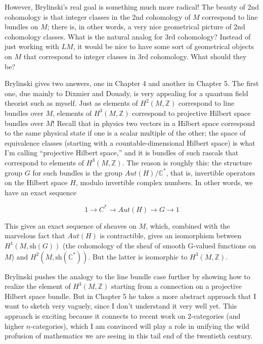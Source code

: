 \documentclass{article}
\begin{document}
However, Brylinski's real goal is something much more radical! The
beauty of 2nd cohomology is that integer classes in the 2nd cohomology
of \(M\) correspond to line bundles on \(M\); there is, in other words,
a very nice geometrical picture of 2nd cohomology classes. What is the
natural analog for 3rd cohomology? Instead of just working with \(LM\),
it would be nice to have some sort of geometrical objects on \(M\) that
correspond to integer classes in 3rd cohomology. What should they be?

Brylinski gives two answers, one in Chapter 4 and another in Chapter 5.
The first one, due mainly to Dixmier and Douady, is very appealing for a
quantum field theorist such as myself. Just as elements of
\(H^2(M,\mathbb{Z})\) correspond to line bundles over \(M\), elements of
\(H^3(M,\mathbb{Z})\) correspond to projective Hilbert space bundles
over \(M\)! Recall that in physics two vectors in a Hilbert space
correspond to the same physical state if one is a scalar multiple of the
other; the space of equivalence classes (starting with a
countable-dimensional Hilbert space) is what I'm calling ``projective
Hilbert space,'' and it is bundles of such rascals that correspond to
elements of \(H^3(M,\mathbb{Z})\). The reason is roughly this: the
structure group \(G\) for such bundles is the group
\(Aut(H)/\mathbb{C}^*\), that is, invertible operators on the Hilbert
space \(H\), modulo invertible complex numbers. In other words, we have
an exact sequence

\[1 \to C^* \to Aut(H) \to G \to 1\]

This gives an exact sequence of sheaves on \(M\), which, combined with
the marvelous fact that \(Aut(H)\) is contractible, gives an isomorphism
between \(H^1(M,\mathrm{sh}(G))\) (the cohomology of the sheaf of smooth
G-valued functions on \(M\)) and \(H^2(M,\mathrm{sh}(\mathbb{C}^*))\).
But the latter is isomorphic to \(H^3(M,\mathbb{Z})\).

Brylinski pushes the analogy to the line bundle case further by showing
how to realize the element of \(H^3(M,\mathbb{Z})\) starting from a
connection on a projective Hilbert space bundle. But in Chapter 5 he
takes a more abstract approach that I want to sketch very vaguely, since
I don't understand it very well yet. This approach is exciting because
it connects to recent work on 2-categories (and higher
\(n\)-categories), which I am convinced will play a role in unifying the
wild profusion of mathematics we are seeing in this tail end of the
twentieth century.
\end{document}
